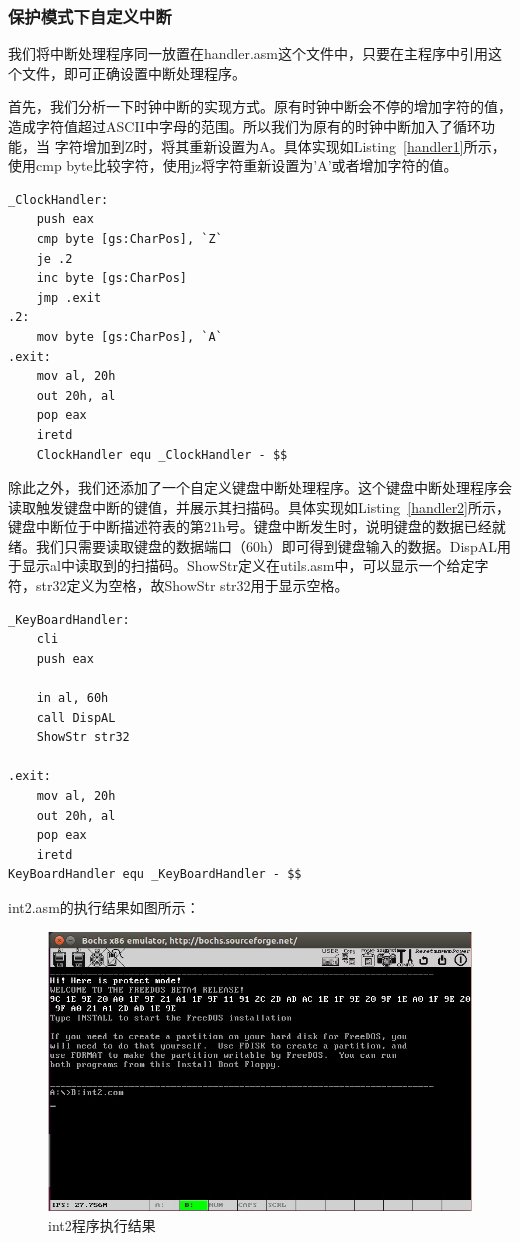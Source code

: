 \documentclass[UTF8,12pt]{ctexart}
\begin{document}
    \subsubsection{保护模式下自定义中断}
    
    我们将中断处理程序同一放置在handler.asm这个文件中，只要在主程序中引用这个文件，即可正确设置中断处理程序。
    
    首先，我们分析一下时钟中断的实现方式。原有时钟中断会不停的增加字符的值，造成字符值超过ASCII中字母的范围。所以我们为原有的时钟中断加入了循环功能，当 字符增加到Z时，将其重新设置为A。具体实现如Listing~\ref{handler1}所示，使用cmp byte比较字符，使用jz将字符重新设置为'A'或者增加字符的值。
    
    \begin{lstlisting}[language={[x86masm]Assembler}, caption={handler.asm}, label={handler1}]
_ClockHandler:
    push eax
    cmp byte [gs:CharPos], `Z`
    je .2
    inc byte [gs:CharPos]
    jmp .exit
.2:
    mov byte [gs:CharPos], `A`
.exit:
    mov al, 20h
    out 20h, al
    pop eax
    iretd
    ClockHandler equ _ClockHandler - $$
    \end{lstlisting}
    
    除此之外，我们还添加了一个自定义键盘中断处理程序。这个键盘中断处理程序会读取触发键盘中断的键值，并展示其扫描码。具体实现如Listing~\ref{handler2}所示，键盘中断位于中断描述符表的第21h号。键盘中断发生时，说明键盘的数据已经就绪。我们只需要读取键盘的数据端口（60h）即可得到键盘输入的数据。DispAL用于显示al中读取到的扫描码。ShowStr定义在utils.asm中，可以显示一个给定字符，str32定义为空格，故ShowStr str32用于显示空格。

    \begin{lstlisting}[language={[x86masm]Assembler}, caption={handler.asm}, label={handler2}]
_KeyBoardHandler:
    cli
    push eax
    
    in al, 60h
    call DispAL
    ShowStr str32

.exit:
    mov al, 20h
    out 20h, al
    pop eax
    iretd
KeyBoardHandler equ _KeyBoardHandler - $$
    \end{lstlisting}
    
    int2.asm的执行结果如图所示：
    
    \begin{figure}[H]
        \centering
        \includegraphics[width=12cm]{images/int2结果.png}
        \caption{int2程序执行结果}
        \label{int2}
    \end{figure}
    
\end{document}
